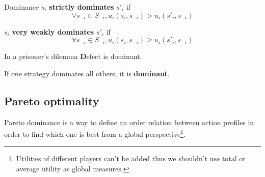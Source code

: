 \documentclass{tufte-handout}
\begin{document}
\begin{definition}{Dominance}
$s_i$ \textbf{strictly dominates} $s'_i$ if
  \[\forall s_{-i} \in S_{-i}, u_i(s_i, s_{-i}) > u_i(s'_i, s_{-i})\]

$s_i$ \textbf{very weakly dominates} $s'_i$ if
  \[\forall s_{-i} \in S_{-i}, u_i(s_i, s_{-i}) \geq u_i(s'_i, s_{-i})\]
\end{definition}

\begin{marginfigure}

\vspace*{5mm}

In a prisoner's dilemma \textbf{D}efect is dominant.

\begin{center}
\end{center}
\end{marginfigure}

If one strategy dominates all others, it is \textbf{dominant}.

\subsection{Pareto optimality}

Pareto dominance is a way to define an order relation between
action profiles in order to find which one is best from a global
perspective\footnote{Utilities of different players can't be added
thus we shouldn't use total or average utility as global measures.}.
\end{document}

